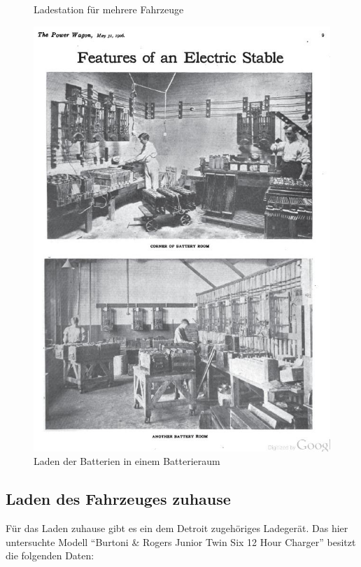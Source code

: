 \begin{landscape}
\begin{figure}
\begin{minipage}{0.65\textwidth}
	\caption{Ladestation für mehrere Fahrzeuge \cite{laden_alt}}
	\label{fig:Laden_Garage}
\end{minipage}
\begin{minipage}{0.65\textwidth}
	\includegraphics[width=\textwidth]{images/Laden_Batterieraum.jpg}
	\caption{Laden der Batterien in einem Batterieraum \cite{laden_alt}}
	\label{fig:Laden_Batterieraum}
\end{minipage}
\end{figure}
\end{landscape}

\subsection{Laden des Fahrzeuges zuhause}
Für das Laden zuhause gibt es ein dem Detroit zugehöriges Ladegerät. Das hier untersuchte Modell "`Burtoni \& Rogers Junior Twin Six 12 Hour Charger"' besitzt die folgenden Daten:

